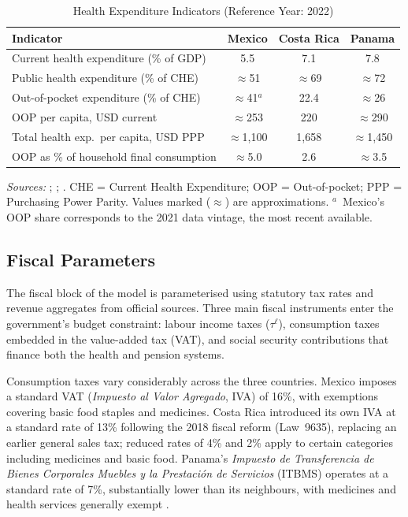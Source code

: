 \documentclass[12pt,a4paper]{article}
\begin{document}
\begin{table}[htbp]
\centering
\caption{Health Expenditure Indicators (Reference Year: 2022)}
\label{tab:health_exp}
\begin{tabular}{lccc}
\hline\hline
\textbf{Indicator} & \textbf{Mexico} & \textbf{Costa Rica} & \textbf{Panama} \\
\hline
Current health expenditure (\% of GDP)       & 5.5          & 7.1   & 7.8   \\
Public health expenditure (\% of CHE)        & $\approx$51  & $\approx$69 & $\approx$72 \\
Out-of-pocket expenditure (\% of CHE)        & $\approx$41$^{a}$ & 22.4 & $\approx$26 \\
OOP per capita, USD current                  & $\approx$253 & 220   & $\approx$290 \\
Total health exp.\ per capita, USD PPP       & $\approx$1{,}100 & 1{,}658 & $\approx$1{,}450 \\
OOP as \% of household final consumption     & $\approx$5.0 & 2.6   & $\approx$3.5 \\
\hline\hline
\end{tabular}
\begin{minipage}{\linewidth}
\smallskip
\footnotesize
\textit{Sources:} \citet{WHOGHED2024}; \citet{OECDHaG2023};
\citet{WHOGHO2024}. CHE = Current Health Expenditure; OOP =
Out-of-pocket; PPP = Purchasing Power Parity. Values marked
($\approx$) are approximations. $^{a}$~Mexico's OOP share
corresponds to the 2021 data vintage, the most recent available.
\end{minipage}
\end{table}

\subsection{Fiscal Parameters}\label{subsec:fiscal}

The fiscal block of the model is parameterised using statutory tax
rates and revenue aggregates from official sources. Three main fiscal
instruments enter the government's budget constraint: labour income
taxes ($\tau^{\ell}$), consumption taxes embedded in the value-added
tax (VAT), and social security contributions that finance both the
health and pension systems.

Consumption taxes vary considerably across the three countries. Mexico
imposes a standard VAT (\textit{Impuesto al Valor Agregado}, IVA) of
16\%, with exemptions covering basic food staples and medicines. Costa
Rica introduced its own IVA at a standard rate of 13\% following the
2018 fiscal reform (Law~9635), replacing an earlier general sales tax;
reduced rates of 4\% and 2\% apply to certain categories including
medicines and basic food. Panama's \textit{Impuesto de Transferencia de
Bienes Corporales Muebles y la Prestaci\'{o}n de Servicios} (ITBMS)
operates at a standard rate of 7\%, substantially lower than its
neighbours, with medicines and health services generally exempt
\citep{PwCWWTS2024}.
\end{document}
